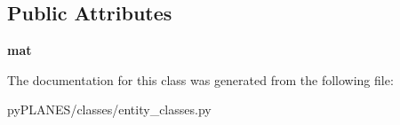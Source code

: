 \subsection*{Public Attributes}
\begin{DoxyCompactItemize}
\item 
\mbox{\label{classpy_p_l_a_n_e_s_1_1classes_1_1entity__classes_1_1_elastic_fem_a64da06452fee91e2520768863f1bc815}} 
{\bfseries mat}
\end{DoxyCompactItemize}


The documentation for this class was generated from the following file\+:\begin{DoxyCompactItemize}
\item 
py\+P\+L\+A\+N\+E\+S/classes/entity\+\_\+classes.\+py\end{DoxyCompactItemize}
